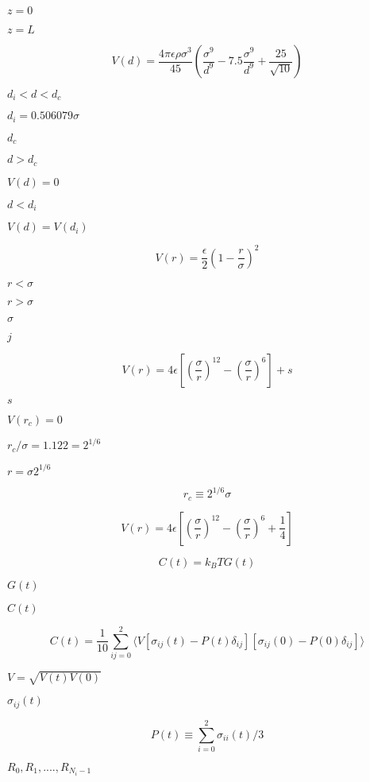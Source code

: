 \documentclass{article}
\begin{document}
$z = 0$
\pagebreak

$z = L$
\pagebreak

\[ V(d) = \frac{4\pi \epsilon \rho\sigma^{3}} {45} \left ( \frac{\sigma^{9}}{d^{9}} - 7.5 \frac{\sigma^{9}}{d^{9}} + \frac{25}{\sqrt{10}} \right) \]
\pagebreak

$ d_{i} < d < d_{c} $
\pagebreak

$ d_{i} = 0.506079 \sigma $
\pagebreak

$ d_{c} $
\pagebreak

$ d > d_{c} $
\pagebreak

$ V(d) = 0 $
\pagebreak

$ d < d_{i} $
\pagebreak

$ V(d) = V(d_{i}) $
\pagebreak

\[ V(r) = \frac{\epsilon}{2} \left ( 1 - \frac{ r}{\sigma} \right )^{2} \]
\pagebreak

$ r < \sigma $
\pagebreak

$ r > \sigma $
\pagebreak

$\sigma$
\pagebreak

$j$
\pagebreak

\[ V(r) = 4 \epsilon \left [ \left ( \frac{\sigma}{r} \right )^{12} - \left ( \frac{\sigma}{r} \right )^{6} \right ] + s \]
\pagebreak

$s$
\pagebreak

$V(r_c) = 0$
\pagebreak

$r_{c}/\sigma = 1.122 = 2^{1/6}$
\pagebreak

$ r = \sigma 2^{1/6}$
\pagebreak

\[ r_{c} \equiv 2^{1/6} \sigma \]
\pagebreak

\[ V(r) = 4 \epsilon \left [ \left ( \frac{\sigma}{r} \right )^{12} - \left ( \frac{\sigma}{r} \right )^{6} + \frac{1}{4} \right ] \]
\pagebreak

\[ C(t) = k_{B}T G(t) \]
\pagebreak

$G(t)$
\pagebreak

$C(t)$
\pagebreak

\[ C(t) = \frac{1}{10} \sum_{ij=0}^{2} \langle V [\sigma_{ij}(t) - P(t)\delta_{ij}] [\sigma_{ij}(0) - P(0)\delta_{ij}] \rangle \]
\pagebreak

$V = \sqrt{V(t)V(0)}$
\pagebreak

$\sigma_{ij}(t)$
\pagebreak

\[ P(t) \equiv \sum_{i=0}^{2} \sigma_{ii}(t)/3 \]
\pagebreak

$ R_0, R_1, ...., R_{N_{i}-1} $
\pagebreak
\end{document}
